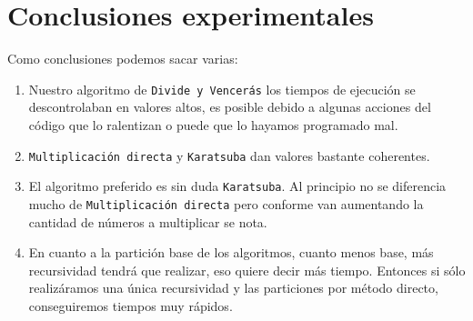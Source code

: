 \documentclass{article}
\begin{document}
\newpage
\section{Conclusiones experimentales}
Como conclusiones podemos sacar varias:
	\begin{enumerate}
	\item Nuestro algoritmo de \texttt{Divide y Vencerás} los tiempos de ejecución se descontrolaban en valores altos, es posible debido a algunas acciones del código que lo ralentizan o puede que lo hayamos programado mal.
	\item \texttt{Multiplicación directa} y \texttt{Karatsuba} dan valores bastante coherentes.
	\item El algoritmo preferido es sin duda \texttt{Karatsuba}. Al principio no se diferencia mucho de \texttt{Multiplicación directa} pero conforme van aumentando la cantidad de números a multiplicar se nota.
	\item En cuanto a la partición base de los algoritmos, cuanto menos base, más recursividad tendrá que realizar, eso quiere decir más tiempo. Entonces si sólo realizáramos una única recursividad y las particiones por método directo, conseguiremos tiempos muy rápidos.
	\end{enumerate}
	
\end{document}
